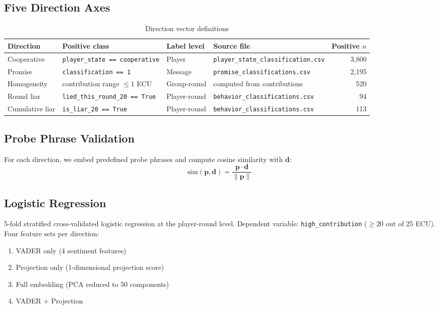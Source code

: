 \documentclass[11pt,oneside]{article}
\begin{document}
\subsection{Five Direction Axes}

\begin{table}[H]
\centering
\caption{Direction vector definitions}
\label{tab:directions}
\footnotesize
\begin{tabular}{llllr}
\toprule
Direction & Positive class & Label level & Source file & Positive $n$ \\
\midrule
Cooperative & \texttt{player\_state == cooperative} & Player & \texttt{player\_state\_classification.csv} & 3,800 \\
Promise & \texttt{classification == 1} & Message & \texttt{promise\_classifications.csv} & 2,195 \\
Homogeneity & contribution range $\leq 1$ ECU & Group-round & computed from contributions & 520 \\
Round liar & \texttt{lied\_this\_round\_20 == True} & Player-round & \texttt{behavior\_classifications.csv} & 94 \\
Cumulative liar & \texttt{is\_liar\_20 == True} & Player-round & \texttt{behavior\_classifications.csv} & 113 \\
\bottomrule
\end{tabular}
\end{table}

\subsection{Probe Phrase Validation}

For each direction, we embed predefined probe phrases and compute cosine similarity with $\mathbf{d}$:
\begin{equation}
    \text{sim}(\mathbf{p}, \mathbf{d}) = \frac{\mathbf{p} \cdot \mathbf{d}}{\|\mathbf{p}\|}
\end{equation}

\subsection{Logistic Regression}

5-fold stratified cross-validated logistic regression at the player-round level. Dependent variable: \texttt{high\_contribution} ($\geq 20$ out of 25 ECU). Four feature sets per direction:
\begin{enumerate}
    \item VADER only (4 sentiment features)
    \item Projection only (1-dimensional projection score)
    \item Full embedding (PCA reduced to 50 components)
    \item VADER + Projection
\end{enumerate}
\end{document}

